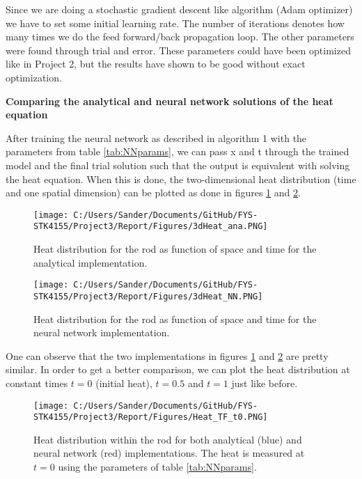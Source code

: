 \documentclass[12pt,a4paper]{article}
\begin{document}
\noindent Since we are doing a stochastic gradient descent like algorithm (Adam optimizer) we have to set some initial learning rate. The number of iterations denotes how many times we do the feed forward/back propagation loop. The other parameters were found through trial and error. These parameters could have been optimized like in Project 2, but the results have shown to be good without exact optimization.

\begin{center}
\large{\textbf{Comparing the analytical and neural network solutions of the heat equation}}
\end{center}

\noindent After training the neural network as described in algorithm 1 with the parameters from table \ref{tab:NNparams}, we can pass x and t through the trained model and the final trial solution such that the output is equivalent with solving the heat equation. When this is done, the two-dimensional heat distribution (time and one spatial dimension) can be plotted as done in figures \ref{fig:3dHeatAna} and \ref{fig:3dHeatNN}.

\begin{figure}[H]
\centering
\texttt{[image: C:/Users/Sander/Documents/GitHub/FYS-STK4155/Project3/Report/Figures/3dHeat\_ana.PNG]}
\caption{\label{fig:3dHeatAna} Heat distribution for the rod as function of space and time for the analytical implementation.}
\end{figure}

\begin{figure}[H]
\centering
\texttt{[image: C:/Users/Sander/Documents/GitHub/FYS-STK4155/Project3/Report/Figures/3dHeat\_NN.PNG]}
\caption{\label{fig:3dHeatNN} Heat distribution for the rod as function of space and time for the neural network implementation.}
\end{figure}

\noindent One can observe that the two implementations in figures \ref{fig:3dHeatAna} and \ref{fig:3dHeatNN} are pretty similar. In order to get a better comparison, we can plot the heat distribution at constant times $t = 0$ (initial heat), $t = 0.5$ and $t = 1$ just like before.

\begin{figure}[H]
\centering
\texttt{[image: C:/Users/Sander/Documents/GitHub/FYS-STK4155/Project3/Report/Figures/Heat\_TF\_t0.PNG]}
\caption{\label{fig:rodHeatTF0} Heat distribution within the rod for both analytical (blue) and neural network (red) implementations. The heat is measured at $t = 0$ using the parameters of table \ref{tab:NNparams}.}
\end{figure}
\end{document}

